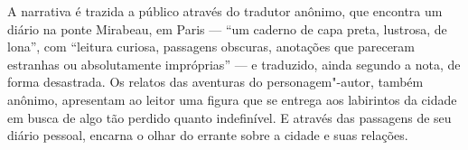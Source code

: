A narrativa é trazida a público através do tradutor anônimo, que encontra um diário na ponte Mirabeau, em Paris --- ``um caderno de capa preta, lustrosa, de lona'', com ``leitura curiosa, passagens obscuras, anotações que pareceram estranhas ou absolutamente impróprias'' --- e traduzido, ainda segundo a nota, de forma desastrada. Os relatos das aventuras do personagem"-autor, também anônimo, apresentam ao leitor uma figura que se entrega aos labirintos da cidade em busca de algo tão perdido quanto indefinível. E através das passagens de seu diário pessoal, encarna o olhar do errante sobre a cidade e suas relações.

\vfill

\hspace*{-.4cm}\begin{minipage}[c]{1\linewidth}
\small{
{}}
\end{minipage}

\pagebreak

\vspace*{1.5cm}


\bigskip

\hfill{}

\bigskip
\bigskip
\bigskip

